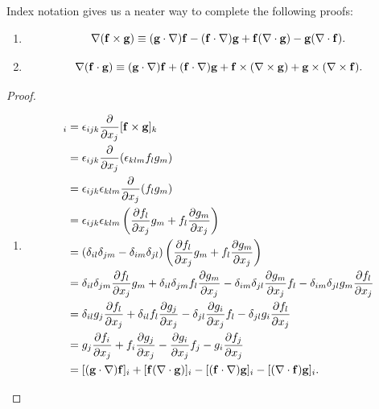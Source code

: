 \documentclass[10pt, a4paper]{article}
\begin{document}
Index notation gives us a neater way to complete the following proofs:
\begin{proposition}[continues = mathmethII:prop:prodrules]\phantom{}
    \begin{enumerate}[label = (\arabic*)]
        \item[(5)]
        \[
        \mathbf{\nabla} (\mathbf{f} \times \mathbf{g}) \equiv (\mathbf{g} \cdot \mathbf{\nabla})\mathbf{f} - (\mathbf{f}\cdot\mathbf{\nabla})\mathbf{g} + \mathbf{f}(\mathbf{\nabla} \cdot\mathbf{g}) - \mathbf{g}(\mathbf{\nabla} \cdot \mathbf{f}).
        \]
    
        \item[(6)]
        \[
        \mathbf{\nabla}(\mathbf{f} \cdot \mathbf{g}) \equiv (\mathbf{g}\cdot\mathbf{\nabla})\mathbf{f} + (\mathbf{f}\cdot\mathbf{\nabla})\mathbf{g} + \mathbf{f}\times(\mathbf{\nabla} \times \mathbf{g}) + \mathbf{g} \times (\mathbf{\nabla} \times \mathbf{f}).
        \]
    \end{enumerate}

    \begin{proof}
        \begin{enumerate}[label = (\arabic*)]
            \item[(5)]
            \begin{align*}
                [\bnabla \times (\vec{f} \times \vec{g})]_i &= \epsilon_{ijk}\pd{x_j}[\vec{f} \times \vec{g}]_k \\
                &= \epsilon_{ijk}\pd{x_j}(\epsilon_{klm}f_lg_m) \\
                &= \epsilon_{ijk}\epsilon_{klm}\pd{x_j}(f_lg_m) \\
                &= \epsilon_{ijk}\epsilon_{klm}\left(\pd[f_l]{x_j}g_m + f_l\pd[g_m]{x_j}\right) \\
                &= (\delta_{il}\delta_{jm} - \delta_{im}\delta_{jl})\left(\pd[f_l]{x_j}g_m + f_l\pd[g_m]{x_j}\right) \\
                &= \delta_{il}\delta_{jm}\pd[f_l]{x_j}g_m + \delta_{il}\delta_{jm}f_l\pd[g_m]{x_j} - \delta_{im}\delta_{jl}\pd[g_m]{x_j}f_l - \delta_{im}\delta_{jl}g_m\pd[f_l]{x_j} \\
                &= \delta_{il}g_j\pd[f_l]{x_j} + \delta_{il}f_l\pd[g_j]{x_j} - \delta_{jl}\pd[g_i]{x_j}f_l - \delta_{jl}g_i\pd[f_l]{x_j} \\
                &= g_j\pd[f_i]{x_j} + f_i\pd[g_j]{x_j} - \pd[g_i]{x_j}f_j - g_i\pd[f_j]{x_j} \\
                &= [(\vec{g} \cdot \bnabla)\vec{f}]_i + [\vec{f}(\bnabla\cdot\vec{g})]_i - [(\vec{f}\cdot\bnabla)\vec{g}]_i - [(\bnabla \cdot \vec{f)\vec{g}}]_i.
            \end{align*}
            

\end{enumerate}
\end{proof}
\end{proposition}
\end{document}

